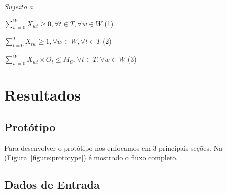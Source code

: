 \documentclass[12pt]{article}
\begin{document}
\begin{center}
	${Sujeito}$ ${a}$
\end{center}
\begin{center}\Large
	${\sum_{w=0}^{W} X_{wt} \geq 0} , \forall t \in T, \forall w \in W$ (1)
\end{center}
\begin{center}\Large
	${\sum_{t=0}^{T} X_{tw} \geq 1}, \forall w \in W , \forall t \in T$ (2)
\end{center}
\begin{center}\Large
	${\sum_{w=0}^{W} X_{wt} \times O_t \leq M_O} , \forall t \in T, \forall w \in W$ (3)
\end{center}

\section{Resultados}

\subsection{Protótipo}

Para desenvolver o protótipo nos enfocamos em 3 principais seções. Na (Figura~\ref{figure:prototype}) é mostrado o fluxo completo.

\subsection{Dados de Entrada}
\end{document}
